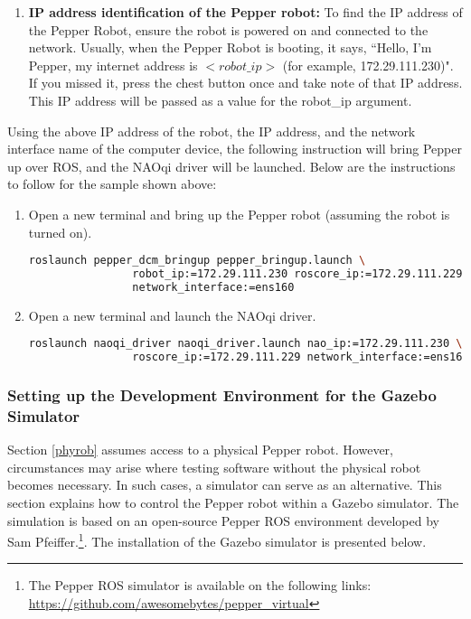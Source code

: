 \documentclass{CSSRforAfrica}
\begin{document}
{{\begin{enumerate}
				\item \textbf{IP address identification of the Pepper robot:}
				To find the IP address of the Pepper Robot, ensure the robot is powered on and connected to the network. Usually, when the Pepper Robot is booting, it says, ``Hello, I'm Pepper, my internet address is $<robot\_ip >$ (for example, 172.29.111.230)". If you missed it, press the chest button once and take note of that IP address. This IP address will be passed as a value for the robot\_ip argument.
				
			\end{enumerate}
			\noindent Using the above IP address of the robot, the IP address, and the network interface name of the computer device, the following instruction will bring Pepper up over ROS, and the NAOqi driver will be launched. Below are the instructions to follow for the sample shown above:
			
			\begin{enumerate}
				\item Open a new terminal and bring up the Pepper robot (assuming the robot is turned on).
				\begin{lstlisting}[style=withoutNumbering, language=bash]
				roslaunch pepper_dcm_bringup pepper_bringup.launch \
				robot_ip:=172.29.111.230 roscore_ip:=172.29.111.229 \
				network_interface:=ens160
				\end{lstlisting}
				
				\item Open a new terminal and launch the NAOqi driver.
				\begin{lstlisting}[style=withoutNumbering, language=bash]
				roslaunch naoqi_driver naoqi_driver.launch nao_ip:=172.29.111.230 \
				roscore_ip:=172.29.111.229 network_interface:=ens160
				\end{lstlisting} 
			\end{enumerate}
		}
		
		\subsubsection{Setting up the Development Environment for the Gazebo Simulator}
		\label{simulator}
		Section \ref{phyrob} assumes access to a physical Pepper robot. However, circumstances may arise where testing software without the physical robot becomes necessary. In such cases, a simulator can serve as an alternative. This section explains how to control the Pepper robot within a Gazebo simulator. The simulation is based on an open-source Pepper ROS environment developed by Sam Pfeiffer.\footnote{The Pepper ROS simulator is available on the following links: \url{https://github.com/awesomebytes/pepper\_virtual}}. The installation of the Gazebo simulator is presented below.
		
}
\end{document}
